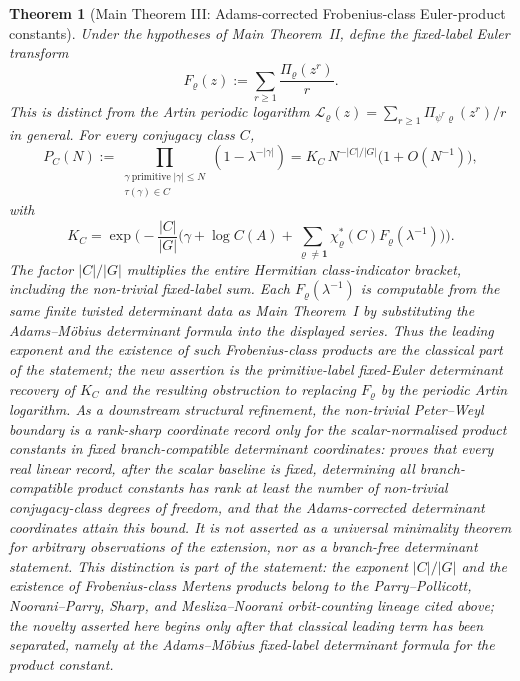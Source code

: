 \documentclass[11pt,a4paper]{amsart}
\theoremstyle{plain}
\newtheorem{theorem}{Theorem}[section]
\theoremstyle{definition}
\theoremstyle{remark}
\begin{document}
\begin{theorem}[Main Theorem III: Adams-corrected Frobenius-class Euler-product constants]
  \label{stmt:main-theorem-iii-adams-frobenius-products}
  \label{thm:intro-adams-frobenius-products}
  Under the hypotheses of Main Theorem~II, define the fixed-label Euler
  transform
  \[
    F_\varrho(z):=\sum_{r\ge1}\frac{\Pi_\varrho(z^r)}{r}.
  \]
  This is distinct from the Artin periodic logarithm
  \(\mathcal L_\varrho(z)=\sum_{r\ge1}\Pi_{\psi^r\varrho}(z^r)/r\) in
  general.  For every conjugacy class \(C\),
  \[
    P_C(N):=
    \prod_{\substack{\gamma\ \mathrm{primitive}\; |\gamma|\le N\\
      \tau(\gamma)\in C}}
      (1-\lambda^{-|\gamma|})
    =K_C\,N^{-|C|/|G|}\bigl(1+O(N^{-1})\bigr),
  \]
  with
  \[
    K_C=\exp\biggl(-\frac{|C|}{|G|}
      \biggl(\gamma+\log C(A)+
        \sum_{\varrho\neq\mathbf1}\chi_\varrho^\ast(C)
          F_\varrho(\lambda^{-1})\biggr)\biggr).
  \]
  The factor \(|C|/|G|\) multiplies the entire Hermitian class-indicator
  bracket, including the non-trivial fixed-label sum.  Each
  \(F_\varrho(\lambda^{-1})\) is computable from the same finite
  twisted determinant data as Main Theorem~I by substituting the
  Adams--M\"obius determinant formula into the displayed series.  Thus
  the leading exponent and the existence of such Frobenius-class products
  are the classical part of the statement; the new assertion is the
  primitive-label fixed-Euler determinant recovery of \(K_C\) and the
  resulting obstruction to replacing \(F_\varrho\) by the periodic Artin
  logarithm.  As a downstream structural refinement, the non-trivial
  Peter--Weyl boundary is a rank-sharp coordinate record only for the
  scalar-normalised product constants in fixed branch-compatible determinant
  coordinates:
   proves that every
  real linear record, after the scalar baseline is fixed, determining all
  branch-compatible product constants has rank
  at least the number of non-trivial conjugacy-class degrees of freedom,
  and that the Adams-corrected determinant coordinates attain this bound.
  It is not asserted as a universal minimality theorem for arbitrary
  observations of the extension, nor as a branch-free determinant statement.
  This distinction is part of the statement: the exponent
  \(|C|/|G|\) and the existence of Frobenius-class Mertens products belong
  to the Parry--Pollicott, Noorani--Parry, Sharp, and Mesliza--Noorani
  orbit-counting lineage cited above; the novelty asserted here begins
  only after that classical leading term has been separated, namely at the
  Adams--M\"obius fixed-label determinant formula for the product
  constant.
\end{theorem}
\end{document}
